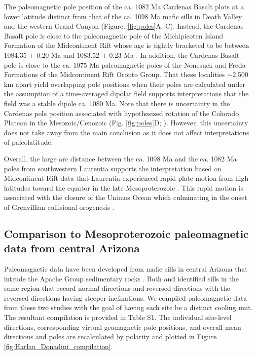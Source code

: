 The paleomagnetic pole position of the ca. 1082 Ma Cardenas Basalt plots at a lower latitude distinct from that of the ca. 1098 Ma mafic sills in Death Valley and the western Grand Canyon (Figure. \ref{fig:poles}A, C). Instead, the Cardenas Basalt pole is close to the paleomagnetic pole of the Michipicoten Island Formation of the Midcontinent Rift whose age is tightly bracketed to be between 1084.35 $\pm$ 0.20 Ma and 1083.52 $\pm$ 0.23 Ma \cite{Fairchild2017a}. In addition, the Cardenas Basalt pole is close to the ca. 1075 Ma paleomagnetic poles of the Nonesuch and Freda Formations \cite{Henry1977a, Slotznick2023a} of the Midcontinent Rift Oronto Group. That these localities $\sim$2,500 km apart yield overlapping pole positions when their poles are calculated under the assumption of a time-averaged dipolar field supports interpretations that the field was a stable dipole ca. 1080 Ma. Note that there is uncertainty in the Cardenas pole position associated with hypothesized rotation of the Colorado Plateau in the Mesozoic/Cenozoic (Fig. \ref{fig:poles}D; ). However, this uncertainty does not take away from the main conclusion as it does not affect interpretations of paleolatitude.

Overall, the large arc distance between the ca. 1098 Ma and the ca. 1082 Ma poles from southwestern Laurentia supports the interpretation based on Midcontinent Rift data that Laurentia experienced rapid plate motion from high latitudes toward the equator in the late Mesoproterozoic \cite{Davis1997a, Swanson-Hysell2009a}. This rapid motion is associated with the closure of the Unimos Ocean which culminating in the onset of Grenvillian collisional orogenesis \cite{Swanson-Hysell2023a}. 

\subsection*{Comparison to Mesoproterozoic paleomagnetic data from central Arizona}

Paleomagnetic data have been developed from mafic sills in central Arizona that intrude the Apache Group sedimentary rocks \cite{Helsley1972a, Harlan1993a, Donadini2011a}. Both  and  identified sills in the same region that record normal directions and reversed directions with the reversed directions having steeper inclinations. We compiled paleomagnetic data from these two studies with the goal of having each site be a distinct cooling unit. The resultant compilation is provided in Table S1. The individual site-level directions, corresponding virtual geomagnetic pole positions, and overall mean directions and poles are recalculated by polarity and plotted in Figure \ref{fig:Harlan_Donadini_compilation}. 

